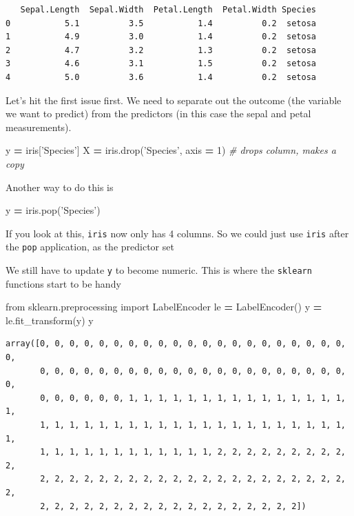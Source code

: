 \documentclass[
  letterpaper,
]{scrbook}
\newenvironment{Shaded}{\begin{snugshade}}{\end{snugshade}}
\newcommand{\CommentTok}[1]{\textcolor[rgb]{0.56,0.35,0.01}{\textit{#1}}}
\newcommand{\DecValTok}[1]{\textcolor[rgb]{0.00,0.00,0.81}{#1}}
\newcommand{\ImportTok}[1]{#1}
\newcommand{\NormalTok}[1]{#1}
\newcommand{\OperatorTok}[1]{\textcolor[rgb]{0.81,0.36,0.00}{\textbf{#1}}}
\newcommand{\StringTok}[1]{\textcolor[rgb]{0.31,0.60,0.02}{#1}}
\begin{document}
\begin{verbatim}
   Sepal.Length  Sepal.Width  Petal.Length  Petal.Width Species
0           5.1          3.5           1.4          0.2  setosa
1           4.9          3.0           1.4          0.2  setosa
2           4.7          3.2           1.3          0.2  setosa
3           4.6          3.1           1.5          0.2  setosa
4           5.0          3.6           1.4          0.2  setosa
\end{verbatim}

Let's hit the first issue first. We need to separate out the outcome (the variable we want to predict) from the predictors (in this case the sepal and petal measurements).

\begin{Shaded}
\begin{Highlighting}[]
\NormalTok{y }\OperatorTok{=}\NormalTok{ iris[}\StringTok{'Species'}\NormalTok{]}
\NormalTok{X }\OperatorTok{=}\NormalTok{ iris.drop(}\StringTok{'Species'}\NormalTok{, axis }\OperatorTok{=} \DecValTok{1}\NormalTok{) }\CommentTok{# drops column, makes a copy}
\end{Highlighting}
\end{Shaded}

Another way to do this is

\begin{Shaded}
\begin{Highlighting}[]
\NormalTok{y }\OperatorTok{=}\NormalTok{ iris.pop(}\StringTok{'Species'}\NormalTok{)}
\end{Highlighting}
\end{Shaded}

If you look at this, \texttt{iris} now only has 4 columns. So we could just use \texttt{iris} after the \texttt{pop} application, as the predictor set

We still have to update \texttt{y} to become numeric. This is where the \texttt{sklearn} functions start to be handy

\begin{Shaded}
\begin{Highlighting}[]
\ImportTok{from}\NormalTok{ sklearn.preprocessing }\ImportTok{import}\NormalTok{ LabelEncoder}
\NormalTok{le }\OperatorTok{=}\NormalTok{ LabelEncoder()}
\NormalTok{y }\OperatorTok{=}\NormalTok{ le.fit_transform(y)}
\NormalTok{y}
\end{Highlighting}
\end{Shaded}

\begin{verbatim}
array([0, 0, 0, 0, 0, 0, 0, 0, 0, 0, 0, 0, 0, 0, 0, 0, 0, 0, 0, 0, 0, 0,
       0, 0, 0, 0, 0, 0, 0, 0, 0, 0, 0, 0, 0, 0, 0, 0, 0, 0, 0, 0, 0, 0,
       0, 0, 0, 0, 0, 0, 1, 1, 1, 1, 1, 1, 1, 1, 1, 1, 1, 1, 1, 1, 1, 1,
       1, 1, 1, 1, 1, 1, 1, 1, 1, 1, 1, 1, 1, 1, 1, 1, 1, 1, 1, 1, 1, 1,
       1, 1, 1, 1, 1, 1, 1, 1, 1, 1, 1, 1, 2, 2, 2, 2, 2, 2, 2, 2, 2, 2,
       2, 2, 2, 2, 2, 2, 2, 2, 2, 2, 2, 2, 2, 2, 2, 2, 2, 2, 2, 2, 2, 2,
       2, 2, 2, 2, 2, 2, 2, 2, 2, 2, 2, 2, 2, 2, 2, 2, 2, 2])
\end{verbatim}
\end{document}
